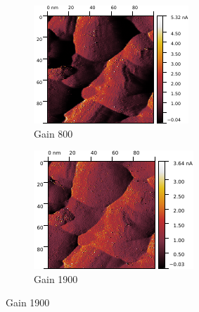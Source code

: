 \begin{figure}[H]
\centering
	\begin{subfigure}{0.49\textwidth}
	\centering
	\includegraphics[width=\textwidth]{../Gwyddion/Gold/GAIN_slow_I_forward.pdf}
	\caption{Gain 800}
	\end{subfigure}
	\begin{subfigure}{0.49\textwidth}
		\centering
		\includegraphics[width=\textwidth]{../Gwyddion/Gold/GAIN_opt_I_forward.pdf}
		\caption{Gain 1900}
	\end{subfigure}


\end{figure}
